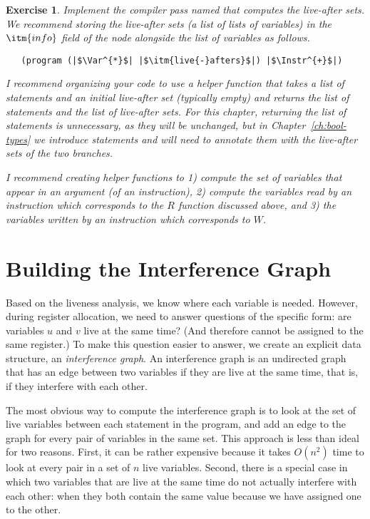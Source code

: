 \documentclass[11pt]{book}
\newtheorem{exercise}[theorem]{Exercise}
\begin{document}
\begin{exercise}\normalfont
Implement the compiler pass named  that computes
the live-after sets. We recommend storing the live-after sets (a list
of lists of variables) in the $\itm{info}$ field of the 
node alongside the list of variables as follows.
\begin{lstlisting}
   (program (|$\Var^{*}$| |$\itm{live{-}afters}$|) |$\Instr^{+}$|)
\end{lstlisting}
I recommend organizing your code to use a helper function that takes a
list of statements and an initial live-after set (typically empty) and
returns the list of statements and the list of live-after sets.  For
this chapter, returning the list of statements is unnecessary, as they
will be unchanged, but in Chapter~\ref{ch:bool-types} we introduce
 statements and will need to annotate them with the live-after
sets of the two branches.

I recommend creating helper functions to 1) compute the set of
variables that appear in an argument (of an instruction), 2) compute
the variables read by an instruction which corresponds to the $R$
function discussed above, and 3) the variables written by an
instruction which corresponds to $W$.
\end{exercise}

\section{Building the Interference Graph}
\label{sec:build-interference}

Based on the liveness analysis, we know where each variable is needed.
However, during register allocation, we need to answer questions of
the specific form: are variables $u$ and $v$ live at the same time?
(And therefore cannot be assigned to the same register.)  To make this
question easier to answer, we create an explicit data structure, an
\emph{interference graph}.  An interference graph is an undirected
graph that has an edge between two variables if they are live at the
same time, that is, if they interfere with each other.

The most obvious way to compute the interference graph is to look at
the set of live variables between each statement in the program, and
add an edge to the graph for every pair of variables in the same set.
This approach is less than ideal for two reasons. First, it can be
rather expensive because it takes $O(n^2)$ time to look at every pair
in a set of $n$ live variables. Second, there is a special case in
which two variables that are live at the same time do not actually
interfere with each other: when they both contain the same value
because we have assigned one to the other.
\end{document}
